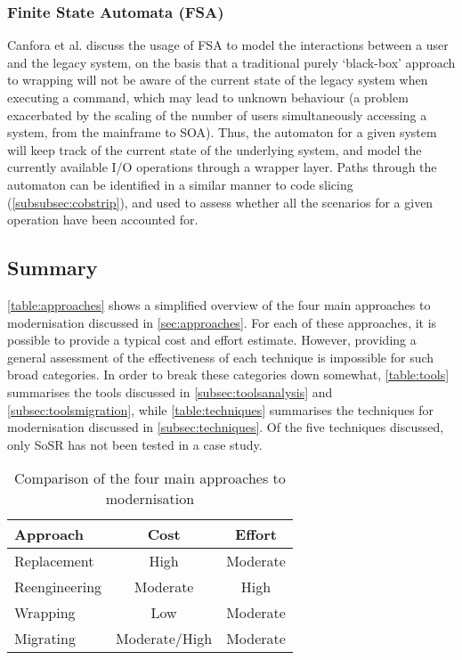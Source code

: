 \documentclass[12pt,journal,compsoc]{IEEEtran}
\begin{document}
\subsubsection{Finite State Automata (FSA)}
Canfora et al. \cite{Canfora2006,Canfora2008} discuss the usage of FSA to model the interactions between a user and the legacy system, on the basis that a traditional purely `black-box' approach to wrapping will not be aware of the current state of the legacy system when executing a command, which may lead to unknown behaviour (a problem exacerbated by the scaling of the number of users simultaneously accessing a system, from the mainframe to SOA). Thus, the automaton for a given system will keep track of the current state of the underlying system, and model the currently available I/O operations through a wrapper layer. Paths through the automaton can be identified in a similar manner to code slicing (\autoref{subsubsec:cobstrip}), and used to assess whether all the scenarios for a given operation have been accounted for.

\subsection{Summary}
\label{subsec:summary}

\autoref{table:approaches} shows a simplified overview of the four main approaches to modernisation discussed in \autoref{sec:approaches}. For each of these approaches, it is possible to provide a typical cost and effort estimate. However, providing a general assessment of the effectiveness of each technique is impossible for such broad categories. In order to break these categories down somewhat, \autoref{table:tools} summarises the tools discussed in \autoref{subsec:toolsanalysis} and \autoref{subsec:toolsmigration}, while \autoref{table:techniques} summarises the techniques for modernisation discussed in \autoref{subsec:techniques}. Of the five techniques discussed, only SoSR has not been tested in a case study.

\begin{table}[h!]
\caption{Comparison of the four main approaches to modernisation}
\label{table:approaches}
\centering
\begin{tabular}{| l | c | c |}
  \hline
  \textbf{Approach} & \textbf{Cost} & \textbf{Effort} \\ \hline
  Replacement & High & Moderate \\ \hline
  Reengineering & Moderate & High \\ \hline
  Wrapping & Low & Moderate \\ \hline
  Migrating & Moderate/High & Moderate \\ \hline
\end{tabular}
\end{table}
\end{document}
